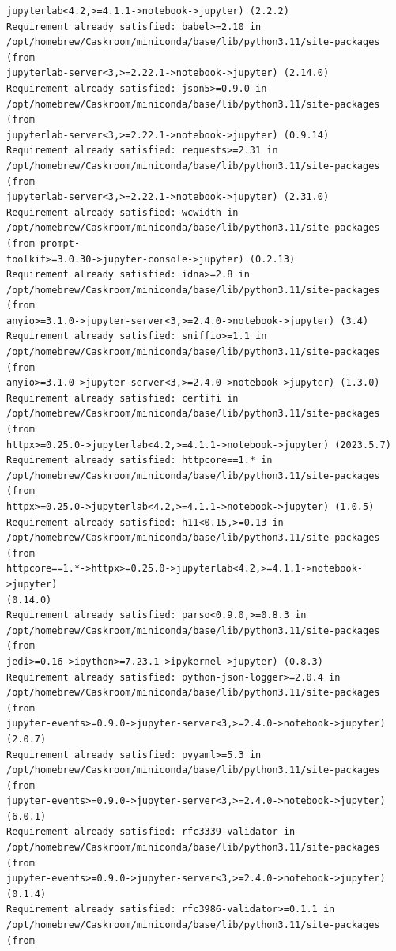 \documentclass[11pt]{article}
\begin{document}
\begin{Verbatim}[commandchars=\\\{\}]
jupyterlab<4.2,>=4.1.1->notebook->jupyter) (2.2.2)
Requirement already satisfied: babel>=2.10 in
/opt/homebrew/Caskroom/miniconda/base/lib/python3.11/site-packages (from
jupyterlab-server<3,>=2.22.1->notebook->jupyter) (2.14.0)
Requirement already satisfied: json5>=0.9.0 in
/opt/homebrew/Caskroom/miniconda/base/lib/python3.11/site-packages (from
jupyterlab-server<3,>=2.22.1->notebook->jupyter) (0.9.14)
Requirement already satisfied: requests>=2.31 in
/opt/homebrew/Caskroom/miniconda/base/lib/python3.11/site-packages (from
jupyterlab-server<3,>=2.22.1->notebook->jupyter) (2.31.0)
Requirement already satisfied: wcwidth in
/opt/homebrew/Caskroom/miniconda/base/lib/python3.11/site-packages (from prompt-
toolkit>=3.0.30->jupyter-console->jupyter) (0.2.13)
Requirement already satisfied: idna>=2.8 in
/opt/homebrew/Caskroom/miniconda/base/lib/python3.11/site-packages (from
anyio>=3.1.0->jupyter-server<3,>=2.4.0->notebook->jupyter) (3.4)
Requirement already satisfied: sniffio>=1.1 in
/opt/homebrew/Caskroom/miniconda/base/lib/python3.11/site-packages (from
anyio>=3.1.0->jupyter-server<3,>=2.4.0->notebook->jupyter) (1.3.0)
Requirement already satisfied: certifi in
/opt/homebrew/Caskroom/miniconda/base/lib/python3.11/site-packages (from
httpx>=0.25.0->jupyterlab<4.2,>=4.1.1->notebook->jupyter) (2023.5.7)
Requirement already satisfied: httpcore==1.* in
/opt/homebrew/Caskroom/miniconda/base/lib/python3.11/site-packages (from
httpx>=0.25.0->jupyterlab<4.2,>=4.1.1->notebook->jupyter) (1.0.5)
Requirement already satisfied: h11<0.15,>=0.13 in
/opt/homebrew/Caskroom/miniconda/base/lib/python3.11/site-packages (from
httpcore==1.*->httpx>=0.25.0->jupyterlab<4.2,>=4.1.1->notebook->jupyter)
(0.14.0)
Requirement already satisfied: parso<0.9.0,>=0.8.3 in
/opt/homebrew/Caskroom/miniconda/base/lib/python3.11/site-packages (from
jedi>=0.16->ipython>=7.23.1->ipykernel->jupyter) (0.8.3)
Requirement already satisfied: python-json-logger>=2.0.4 in
/opt/homebrew/Caskroom/miniconda/base/lib/python3.11/site-packages (from
jupyter-events>=0.9.0->jupyter-server<3,>=2.4.0->notebook->jupyter) (2.0.7)
Requirement already satisfied: pyyaml>=5.3 in
/opt/homebrew/Caskroom/miniconda/base/lib/python3.11/site-packages (from
jupyter-events>=0.9.0->jupyter-server<3,>=2.4.0->notebook->jupyter) (6.0.1)
Requirement already satisfied: rfc3339-validator in
/opt/homebrew/Caskroom/miniconda/base/lib/python3.11/site-packages (from
jupyter-events>=0.9.0->jupyter-server<3,>=2.4.0->notebook->jupyter) (0.1.4)
Requirement already satisfied: rfc3986-validator>=0.1.1 in
/opt/homebrew/Caskroom/miniconda/base/lib/python3.11/site-packages (from

\end{Verbatim}
\end{document}
